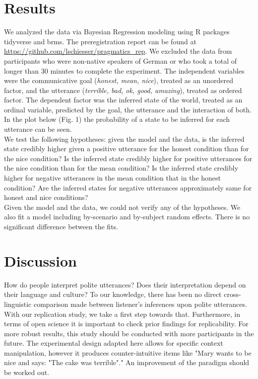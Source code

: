 \documentclass[a4paper,11pt]{article}
\begin{document}
\section{Results}
We analyzed the data via Bayesian Regression modeling using R packages tidyverse and brms. The preregistration report can be found at \url{https://github.com/lschiesser/pragmatics_rep}.  We excluded the data from participants who were non-native speakers of German or who took a total of longer than 30 minutes to complete the experiment. The independent variables were the communicative goal (\textit{honest, mean, nice}), treated as an unordered factor, and the utterance (\textit{terrible, bad, ok, good, amazing}), treated as ordered factor. The dependent factor was the inferred state of the world, treated as an ordinal variable, predicted by the goal, the utterance and the interaction of both. In the plot below (Fig. 1) the probability of a state to be inferred for each utterance can be seen. \\
We test the following hypotheses: given the model and the data, is the inferred state credibly higher given a positive utterance for the honest condition than for the nice condition? Is the inferred state credibly higher for positive utterances for the nice condition than for the mean condition? Is the inferred state credibly higher for negative utterances in the mean condition that in the honest condition? Are the inferred states for negative utterances approximately same for honest and nice conditions? \\
Given the model and the data, we could not verify any of the hypotheses. We also fit a model including by-scenario and by-subject random effects. There is no significant difference between the fits.

\section{Discussion}
How do people interpret polite utterances? Does their interpretation depend on their language and culture? To our knowledge, there has been no direct cross-linguistic comparison made between listener's inferences upon polite utterances. With our replication study, we take a first step towards that. Furthermore, in terms of open science it is important to check prior findings for replicability. For more robust results, this study should be conducted with more participants in the future. The experimental design adapted here allows for specific context manipulation, however it produces counter-intuitive items like "Mary wants to be nice and says: "The cake was terrible"." An improvement of the paradigm should be worked out. 
\end{document}
